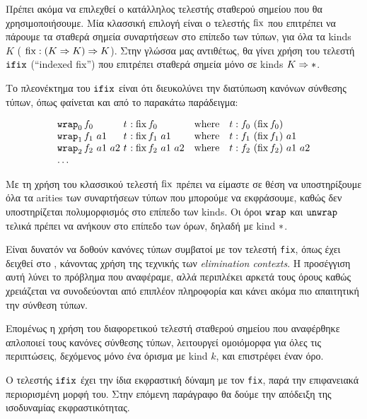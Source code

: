 Πρέπει ακόμα να επιλεχθεί ο κατάλληλος τελεστής σταθερού σημείου που θα
χρησιμοποιήσουμε.  Μία κλασσική επιλογή είναι ο τελεστής  $\operatorname{fix}$ που επιτρέπει
να πάρουμε τα σταθερά σημεία συναρτήσεων στο επίπεδο των τύπων, για όλα τα
kinds $K$ ( $\operatorname{fix} : (K \Rightarrow K) \Rightarrow K$).  Στην γλώσσα μας
αντιθέτως, θα γίνει χρήση του τελεστή $\operatorname{\texttt{ifix}}$ (``indexed fix'') που επιτρέπει
σταθερά σημεία μόνο σε kinds $K \Rightarrow \operatorname{\ast}$.

Το πλεονέκτημα του $\operatorname{\texttt{ifix}}$  είναι ότι διευκολύνει την διατύπωση κανόνων
σύνθεσης τύπων, όπως φαίνεται και από το παρακάτω παράδειγμα:

      \begin{displaymath} \begin{array}{l@{\ }l@{\ }lll} \wrap_0 f_0
        & t &: \fixo f_0 & \textrm{where} & t : f_0\ (\fixo f_0)\\ \wrap_1 f_1
        ~ a1      & t &: \fixo f_1\ a1 & \textrm{where} & t : f_1\ (\fixo f_1)\
        a1\\ \wrap_2 f_2  ~ a1 ~ a2 & t &: \fixo f_2\ a1\ a2 & \textrm{where} &
      t : f_2\ (\fixo f_2)\ a1\ a2\\ \dots & & & & \end{array}
      \end{displaymath}

Με τη χρήση του κλασσικού τελεστή $\operatorname{fix}$ πρέπει να είμαστε σε θέση να
υποστηρίξουμε όλα τα arities των συναρτήσεων τύπων που μπορούμε να εκφράσουμε,
καθώς δεν υποστηρίζεται  πολυμορφισμός στο επίπεδο των kinds. Οι όροι $\operatorname{\texttt{wrap}}$
και $\operatorname{\texttt{unwrap}}$ τελικά πρέπει να ανήκουν στο επίπεδο των όρων, δηλαδή με kind
$\operatorname{\ast}$.

Είναι δυνατόν να δοθούν κανόνες τύπων συμβατοί με τον τελεστή \texttt{fix},
όπως έχει δειχθεί στο \cite{dreyer2005}, κάνοντας χρήση της τεχνικής των
\emph{elimination contexts}. Η προσέγγιση αυτή λύνει το πρόβλημα που αναφέραμε,
αλλά περιπλέκει αρκετά τους όρους καθώς χρειάζεται να συνοδεύονται από επιπλέον
πληροφορία και κάνει ακόμα πιο απαιτητική την σύνθεση τύπων.

Επομένως η χρήση του διαφορετικού τελεστή σταθερού σημείου που αναφέρθηκε
απλοποιεί τους κανόνες σύνθεσης τύπων, λειτουργεί ομοιόμορφα για όλες τις
περιπτώσεις, δεχόμενος μόνο ένα όρισμα με kind $k$, και επιστρέφει έναν όρο.

Ο τελεστής $\operatorname{\texttt{ifix}}$ έχει την ίδια εκφραστική δύναμη με τον \texttt{fix}, παρά
την επιφανειακά περιορισμένη μορφή του.  Στην επόμενη παράγραφο θα δούμε την
απόδειξη της ισοδυναμίας εκφραστικότητας.


